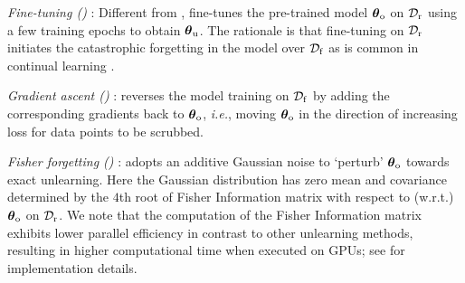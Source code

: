 




\noindent{} \textit{Fine-tuning (\textbf{\FT})} \cite{golatkar2020eternal,warnecke2021machine}:  
Different from    {\retrain}, {\FT} fine-tunes the   pre-trained  model   $\boldsymbol \theta_\mathrm{o}$ on {$\mathcal D_\mathrm{r}$} using a few training epochs to obtain ${\boldsymbol \theta_\mathrm{u}}$. The rationale is that fine-tuning on {$\mathcal D_\mathrm{r}$} initiates the catastrophic forgetting in  the model over {$\mathcal D_\mathrm{f}$} as is common in continual learning \cite{parisi2019continual}. 

\noindent{} \textit{Gradient ascent (\textbf{\GA})} \cite{graves2021amnesiac,thudi2021unrolling}:
{\GA} reverses the model training on  %
$\mathcal D_\mathrm{f}$ by adding the corresponding gradients    back to  $\boldsymbol \theta_\mathrm{o}$, \textit{i.e.}, moving $\boldsymbol \theta_\mathrm{o}$  in the direction of increasing  loss for   data points to be scrubbed. 



\noindent {} \textit{Fisher forgetting (\textbf{\FF})}  \cite{golatkar2020eternal,becker2022evaluating}:
{\FF} adopts  an  additive Gaussian noise  to `perturb'   $\boldsymbol \theta_\mathrm{o}$ towards   exact unlearning.
Here the Gaussian distribution has zero mean  and covariance determined by  the $4$th root of Fisher Information matrix with respect to (w.r.t.) $\boldsymbol \theta_\mathrm{o}$ on   $\mathcal D_\mathrm{r}$.
We note that the computation of the Fisher Information matrix exhibits lower parallel efficiency in contrast to other unlearning methods, resulting in higher computational time when executed on GPUs; see
\citet{golatkar2020eternal} for implementation details. %


